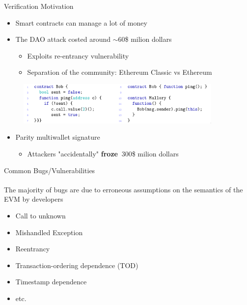 \begin{frame}{Verification Motivation}
    \begin{itemize}
        \item Smart contracts can manage a lot of money
        \item The DAO attack costed around $\sim$$60$\$ milion dollars
        \begin{itemize}
            \item Exploits re-entrancy vulnerability
            \item Separation of the community: Ethereum Classic vs Ethereum
        \end{itemize}
    \end{itemize}

    \begin{figure}
        \includegraphics[width=0.9\textwidth]{./img/reentrancy}
    \end{figure}

    \begin{itemize}
        \item Parity multiwallet signature
        \begin{itemize}
            \item Attackers "accidentally" \textbf{froze} $~300$\$ milion dollars
        \end{itemize}
    \end{itemize}

\end{frame}

\begin{frame}{Common Bugs/Vulnerabilities}
    \framesubtitle{\cite{bib:atzei,luu2016making}}
    The majority of bugs are due to erroneous assumptions on the semantics of the EVM by developers
    \begin{itemize}
        \item Call to unknown
        \item Mishandled Exception
        \item Reentrancy
        \item Transaction-ordering dependence (TOD)
        \item Timestamp dependence
        \item etc.
    \end{itemize}

\end{frame}


